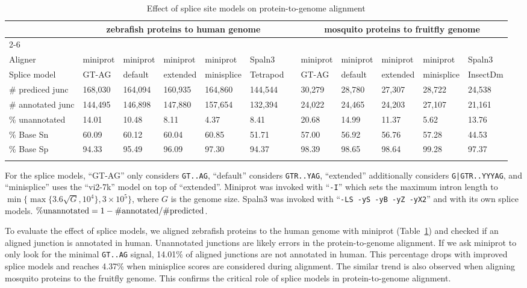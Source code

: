 \documentclass[webpdf,contemporary,large,namedate]{oup-authoring-template}%
\begin{document}
\begin{table}[!tb]
\caption{Effect of splice site models on protein-to-genome alignment\label{tab:eval}}
\begin{tabular*}{\textwidth}{@{\extracolsep\fill}llllllclllll@{\extracolsep\fill}}
\toprule
& \multicolumn{5}{c}{zebrafish proteins to human genome} && \multicolumn{5}{c}{mosquito proteins to fruitfly genome} \\[0.4em]
\cline{2-6}\cline{8-12}\\[-0.9em]
Aligner           & miniprot  & miniprot  & miniprot  & miniprot   & Spaln3    && miniprot & miniprot & miniprot & miniprot   & Spaln3 \\
Splice model      & GT-AG     & default   & extended  & minisplice & Tetrapod  && GT-AG    & default  & extended & minisplice & InsectDm \\
\midrule
\# prediced junc  & 168,030   & 164,094   & 160,935   & 164,860    & 144,544   && 30,279   & 28,780   & 27,307   & 28,722     & 24,538 \\
\# annotated junc & 144,495   & 146,898   & 147,880   & 157,654    & 132,394   && 24,022   & 24,465   & 24,203   & 27,107     & 21,161 \\
\% unannotated    & 14.01     & 10.48     & 8.11      & 4.37       & 8.41      && 20.68    & 14.99    & 11.37    & 5.62       & 13.76 \\
\% Base Sn        & 60.09     & 60.12     & 60.04     & 60.85      & 51.71     && 57.00    & 56.92    & 56.76    & 57.28      & 44.53 \\
\% Base Sp        & 94.33     & 95.49     & 96.09     & 97.30      & 94.37     && 98.39    & 98.65    & 98.64    & 99.28      & 97.37 \\
\botrule
\end{tabular*}
\begin{tablenotes}\setlength\itemsep{0.0em}
For the splice models, ``GT-AG'' only considers {\tt GT..AG},
``default'' considers {\tt GTR..YAG},
``extended'' additionally considers {\tt G|GTR..YYYAG},
and ``minisplice'' uses the ``vi2-7k'' model on top of ``extended''.
Miniprot was invoked with ``{\tt -I}'' which sets the maximum intron length to $\min\{\max\{3.6\sqrt{G},10^4\},3\times10^5\}$, where $G$ is the genome size.
Spaln3 was invoked with ``{\tt -LS -yS -yB -yZ -yX2}'' and with its own splice models.
${\rm\%unannotated}=1-{\rm\#annotated}/{\rm\#predicted}$.
\end{tablenotes}
\end{table}

To evaluate the effect of splice models,
we aligned zebrafish proteins to the human genome with miniprot (Table~\ref{tab:eval})
and checked if an aligned junction is annotated in human.
Unannotated junctions are likely errors in the protein-to-genome alignment.
If we ask miniprot to only look for the minimal {\tt GT..AG} signal, 14.01\% of aligned junctions are not annotated in human.
This percentage drops with improved splice models
and reaches 4.37\% when minisplice scores are considered during alignment.
The similar trend is also observed when aligning mosquito proteins to the fruitfly genome.
This confirms the critical role of splice models in protein-to-genome alignment.
\end{document}
